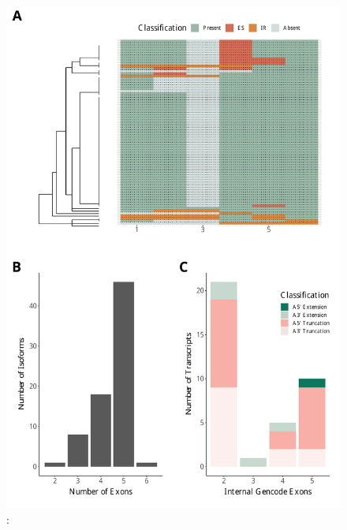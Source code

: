 \begin{figure}[htp]
	\begin{center}
		\includegraphics[page=1,trim={1cm 1cm 0 2cm},scale = 0.55]{Figures/TargetGenes.pdf}
	\end{center}
	\captionsetup{width=0.95\textwidth}
	\caption[Trem2]%
	{\textbf{}: }   
	\label{fig:trem}
\end{figure}

